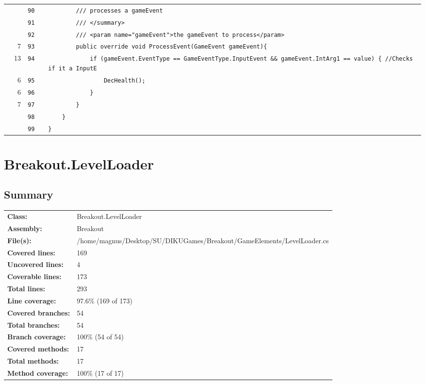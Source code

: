 \documentclass[a4paper,landscape,10pt]{article}
\begin{document}
\begin{longtable}[l]{lrrll}
\cellcolor{gray} &  & \verb~90~ & & \verb~        /// processes a gameEvent~\\
\cellcolor{gray} &  & \verb~91~ & & \verb~        /// </summary>~\\
\cellcolor{gray} &  & \verb~92~ & & \verb~        /// <param name="gameEvent">the gameEvent to process</param>~\\
\cellcolor{green} & 7 & \verb~93~ & & \verb~        public override void ProcessEvent(GameEvent gameEvent){~\\
\cellcolor{orange} & 13 & \verb~94~ & & \verb~            if (gameEvent.EventType == GameEventType.InputEvent && gameEvent.IntArg1 == value) { //Checks if it a InputE~\\
\cellcolor{green} & 6 & \verb~95~ & & \verb~                DecHealth();~\\
\cellcolor{green} & 6 & \verb~96~ & & \verb~            }~\\
\cellcolor{green} & 7 & \verb~97~ & & \verb~        }~\\
\cellcolor{gray} &  & \verb~98~ & & \verb~    }~\\
\cellcolor{gray} &  & \verb~99~ & & \verb~}~\\
\end{longtable}
\newpage
\section{Breakout.LevelLoader}
\subsection{Summary}
\begin{longtable}[l]{ll}
\textbf{Class:} & Breakout.LevelLoader\\
\textbf{Assembly:} & Breakout\\
\textbf{File(s):} & \begin{minipage}[t]{12cm}{/home/magnus/Desktop/SU/DIKUGames/Breakout/GameElements/LevelLoader.cs}\end{minipage} \\
\textbf{Covered lines:} & 169\\
\textbf{Uncovered lines:} & 4\\
\textbf{Coverable lines:} & 173\\
\textbf{Total lines:} & 293\\
\textbf{Line coverage:} & 97.6\% (169 of 173)\\
\textbf{Covered branches:} & 54\\
\textbf{Total branches:} & 54\\
\textbf{Branch coverage:} & 100\% (54 of 54)\\
\textbf{Covered methods:} & 17\\
\textbf{Total methods:} & 17\\
\textbf{Method coverage:} & 100\% (17 of 17)\\
\end{longtable}
\end{document}
